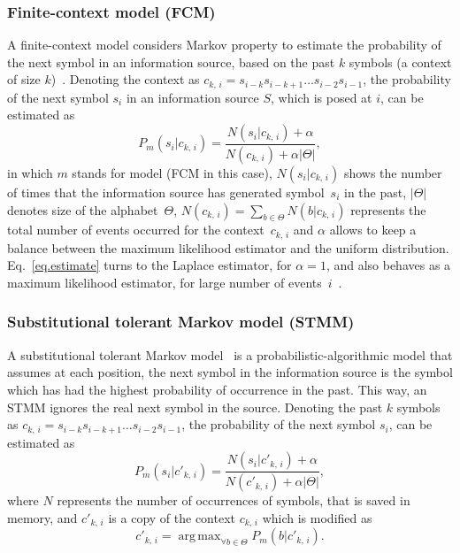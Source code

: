 \documentclass[a4paper,num-refs]{oup-contemporary}
\begin{document}
\subsubsection*{Finite-context model (FCM)}
A finite-context model considers Markov property to estimate the probability of the next symbol in an information source, based on the past $k$ symbols (a context of size $k$)~\cite{hosseini2019ac,sayood2017introduction,pinho2013mfcompress}. Denoting the context as $c_{k,\,i} = s_{i-k} s_{i-k+1}\ldots s_{i-2} s_{i-1}$, the probability of the next symbol $s_i$ in an information source $S$, which is posed at $i$, can be estimated as
\begin{equation} \label{eq.estimate}
  P_m(s_i|c_{k,\,i}) = \frac{N(s_i|c_{k,\,i})+\alpha}{N(c_{k,\,i})+ \alpha|\Theta|},
\end{equation}
in which $m$ stands for model (FCM in this case), $N(s_i|c_{k,\,i})$ shows the number of times that the information source has generated symbol~$s_i$ in the past, $|\Theta|$ denotes size of the alphabet~$\Theta$, $N(c_{k,\,i}) = \sum_{b \in \Theta} N(b|c_{k,\,i})$ represents the total number of events occurred for the context~$c_{k,\,i}$ and $\alpha$ allows to keep a balance between the maximum likelihood estimator and the uniform distribution. Eq.~\ref{eq.estimate} turns to the Laplace estimator, for $\alpha=1$, and also behaves as a maximum likelihood estimator, for large number of events~$i$~\cite{pratas2015alignment}.

 \subsubsection*{Substitutional tolerant Markov model (STMM)}
 A substitutional tolerant Markov model~\cite{pratas2017substitutional} is a probabilistic-algorithmic model that assumes at each position, the next symbol in the information source is the symbol which has had the highest probability of occurrence in the past. This way, an STMM ignores the real next symbol in the source. Denoting the past $k$ symbols as $c_{k,\,i} = s_{i-k} s_{i-k+1}\ldots s_{i-2} s_{i-1}$, the probability of the next symbol $s_i$, can be estimated as
 \begin{equation}
   P_m(s_i|{c'}_{k,\,i}) = \frac{N(s_i|{c'}_{k,\,i})+\alpha}{N({c'}_{k,\,i})+ \alpha|\Theta|},
 \end{equation}
 where $N$ represents the number of occurrences of symbols, that is saved in memory, and ${c'}_{k,\,i}$ is a copy of the context $c_{k,\,i}$ which is modified as
 \begin{equation}
   {c'}_{k,\,i} = \mathop{\mathrm{arg\,max}}_{\forall b\in \Theta}{P_m(b|{c'}_{k,\,i})}.
 \end{equation}
\end{document}
